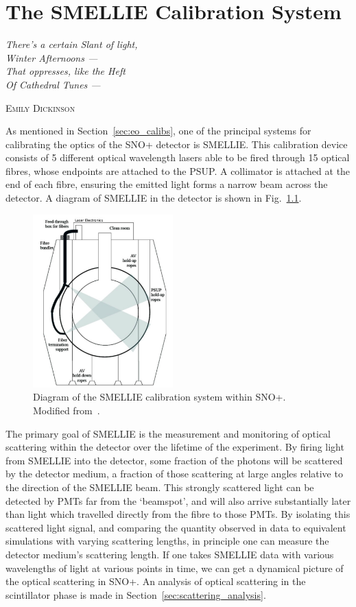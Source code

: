 \chapter{The SMELLIE Calibration System}\label{chap:smellie_hardware}
\epigraph{\textit{There's a certain Slant of light,\\
Winter Afternoons ---\\
That oppresses, like the Heft\\
Of Cathedral Tunes ---}}{\textsc{Emily Dickinson}}

As mentioned in Section~\ref{sec:eo_calibs}, one of the principal systems for calibrating the optics of the SNO+ detector is SMELLIE. This calibration device consists of 5 different optical wavelength lasers able to be fired through 15 optical fibres, whose endpoints are attached to the PSUP. A collimator is attached at the end of each fibre, ensuring the emitted light forms a narrow beam across the detector. A diagram of SMELLIE in the detector is shown in Fig.~\ref{fig:smellie_diagram}.

\begin{figure}
    \centering
    \includegraphics[width=0.48\textwidth]{3_SMELLIEHardware/images/SMELLIE_picture_corrected.png}
    \caption[Diagram of the SMELLIE calibration system within SNO+]
    {Diagram of the SMELLIE calibration system within SNO+. Modified from~\cite{sinclairPositioningTimingCalibration2015}.}
    \label{fig:smellie_diagram}
\end{figure}

The primary goal of SMELLIE is the measurement and monitoring of optical scattering within the detector over the lifetime of the experiment. By firing light from SMELLIE into the detector, some fraction of the photons will be scattered by the detector medium, a fraction of those scattering at large angles relative to the direction of the SMELLIE beam. This strongly scattered light can be detected by PMTs far from the `beamspot', and will also arrive substantially later than light which travelled directly from the fibre to those PMTs. By isolating this scattered light signal, and comparing the quantity observed in data to equivalent simulations with varying scattering lengths, in principle one can measure the detector medium's scattering length. If one takes SMELLIE data with various wavelengths of light at various points in time, we can get a dynamical picture of the optical scattering in SNO+. An analysis of optical scattering in the scintillator phase is made in Section~\ref{sec:scattering_analysis}.

